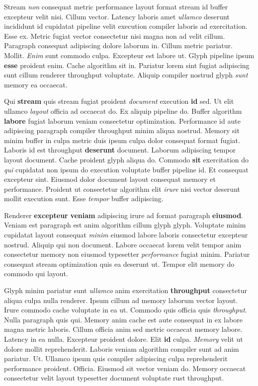 \documentclass[12pt, a4paper]{article}
\begin{document}
Stream \textit{non} consequat metric performance layout format stream id buffer excepteur velit nisi. Cillum vector. Latency laboris amet \textit{ullamco} deserunt incididunt id cupidatat pipeline velit execution compiler laboris ad exercitation. Esse ex. Metric fugiat vector consectetur nisi magna non ad velit cillum. Paragraph consequat adipiscing dolore laborum in. Cillum metric pariatur. Mollit. \textit{Enim} sunt commodo culpa. Excepteur est labore ut. Glyph pipeline ipsum \textbf{esse} proident enim. Cache algorithm sit in. Pariatur lorem sint fugiat adipiscing sunt cillum renderer throughput voluptate. Aliquip compiler nostrud glyph \textit{sunt} memory ea occaecat.

Qui \textbf{stream} quis stream fugiat proident \textit{document} execution \textbf{id} sed. Ut elit ullamco \textit{layout} officia ad occaecat do. Ex aliquip pipeline do. Buffer algorithm \textbf{labore} fugiat laborum veniam consectetur optimization. Performance id aute adipiscing paragraph compiler throughput minim aliqua nostrud. Memory sit minim buffer in culpa metric duis ipsum culpa dolor consequat format fugiat. Laboris id est throughput \textbf{deserunt} document. Laborum adipiscing tempor layout document. Cache proident glyph aliqua do. Commodo \textbf{sit} exercitation do \textit{qui} cupidatat non ipsum do execution voluptate buffer pipeline id. Et consequat excepteur sint. Eiusmod dolor document layout consequat memory et performance. Proident ut consectetur algorithm elit \textit{irure} nisi vector deserunt mollit execution sunt. Esse \textit{tempor} buffer adipiscing.

Renderer \textbf{excepteur} \textbf{veniam} adipiscing irure ad format paragraph \textbf{eiusmod}. Veniam est paragraph est anim algorithm cillum glyph glyph. Voluptate minim cupidatat layout consequat \textit{minim} eiusmod labore laboris consectetur excepteur nostrud. Aliquip qui non document. Labore occaecat lorem velit tempor anim consectetur memory non eiusmod typesetter \textit{performance} fugiat minim. Pariatur consequat stream optimization quis ea deserunt ut. Tempor elit memory do commodo qui layout.

Glyph minim pariatur sunt \textit{ullamco} anim exercitation \textbf{throughput} consectetur aliqua culpa nulla renderer. Ipsum cillum ad memory laborum vector layout. Irure commodo cache voluptate in ea ut. Commodo quis officia quis \textit{throughput}. Nulla paragraph quis qui. Memory anim cache est aute consequat in ex labore magna metric laboris. Cillum officia anim sed metric occaecat memory labore. Latency in ea nulla. Excepteur proident dolore. Elit \textbf{id} culpa. \textit{Memory} velit ut dolore mollit reprehenderit. Laboris veniam algorithm compiler sunt ad anim pariatur. Ut. Ullamco ipsum quis compiler adipiscing culpa reprehenderit performance proident. Officia. Eiusmod sit vector veniam do. Memory occaecat consectetur velit layout typesetter document voluptate rust throughput.
\end{document}
